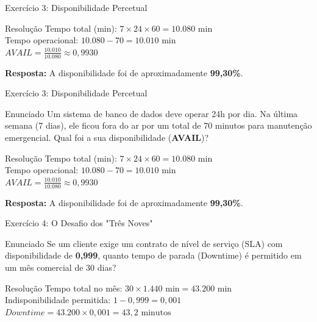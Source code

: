 \documentclass[9pt]{beamer}
\begin{document}
\begin{frame}{Exercício 3: Disponibilidade Percetual}
    \pause
    \begin{exampleblock}{Resolução}
        Tempo total (min): $7 \times 24 \times 60 = 10.080 \text{ min}$ \\
        Tempo operacional: $10.080 - 70 = 10.010 \text{ min}$ \\
        \vspace{0.2cm}
        $AVAIL = \frac{10.010}{10.080} \approx 0,9930$
    \end{exampleblock}

    \textbf{Resposta:} A disponibilidade foi de aproximadamente \textbf{99,30\%}.
\end{frame}\begin{frame}{Exercício 3: Disponibilidade Percetual}
    \begin{block}{Enunciado}
        Um sistema de banco de dados deve operar 24h por dia. Na última semana (7 dias), ele ficou fora do ar por um total de 70 minutos para manutenção emergencial. Qual foi a sua disponibilidade (\textbf{AVAIL})?
    \end{block}

    \pause
    \begin{exampleblock}{Resolução}
        Tempo total (min): $7 \times 24 \times 60 = 10.080 \text{ min}$ \\
        Tempo operacional: $10.080 - 70 = 10.010 \text{ min}$ \\
        \vspace{0.2cm}
        $AVAIL = \frac{10.010}{10.080} \approx 0,9930$
    \end{exampleblock}

    \textbf{Resposta:} A disponibilidade foi de aproximadamente \textbf{99,30\%}.
\end{frame}\begin{frame}{Exercício 4: O Desafio dos "Três Noves"}
    \begin{block}{Enunciado}
        Se um cliente exige um contrato de nível de serviço (SLA) com disponibilidade de \textbf{0,999}, quanto tempo de parada (Downtime) é permitido em um mês comercial de 30 dias?
    \end{block}

    \pause
    \begin{exampleblock}{Resolução}
        Tempo total no mês: $30 \times 1.440 \text{ min} = 43.200 \text{ min}$ \\
        Indisponibilidade permitida: $1 - 0,999 = 0,001$ \\
        \vspace{0.2cm}
        $Downtime = 43.200 \times 0,001 = 43,2 \text{ minutos}$
    \end{exampleblock}


\end{frame}
\end{document}
